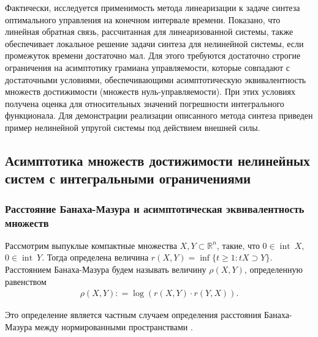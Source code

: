 \documentclass[../main.tex]{subfiles}
\begin{document}
Фактически, исследуется применимость метода линеаризации к задаче синтеза оптимального управления на конечном интервале времени. 
Показано, что линейная обратная связь, рассчитанная для линеаризованной системы, также обеспечивает локальное решение задачи синтеза для нелинейной системы, если промежуток времени достаточно мал. 
Для этого требуются достаточно строгие ограничения на асимптотику грамиана управляемости, которые совпадают с достаточными условиями, обеспечивающими асимптотическую эквивалентность множеств достижимости (множеств нуль-управляемости). 
При этих условиях получена оценка для относительных значений погрешности интегрального функционала. 
Для демонстрации реализации описанного метода синтеза приведен пример нелинейной упругой системы под действием внешней силы. 


\subsection{Асимптотика множеств достижимости нелинейных систем с интегральными ограничениями} 


\subsubsection{Расстояние Банаха-Мазура и асимптотическая эквивалентность множеств}\label{sec21:AsymptoticEquality}

Рассмотрим выпуклые компактные множества $ X,Y \subset \mathbb R^n $, такие, что $0 \in \operatorname{int}\ X$, $0 \in \operatorname{int}\ Y$. 
Тогда определена величина $r(X, Y) = \inf \{t \geqslant 1: tX \supset Y \}$. 
Расстоянием Банаха-Мазура будем называть величину $ \rho (X, Y) $, определенную равенством 
\begin{gather*}
 \rho (X, Y): = \log (r(X,Y) \cdot r(Y, X)).
\end{gather*}

Это определение является частным случаем определения расстояния Банаха-Мазура между нормированными пространствами \cite[Определение 2.4.6]{Thompson}.
\end{document}
